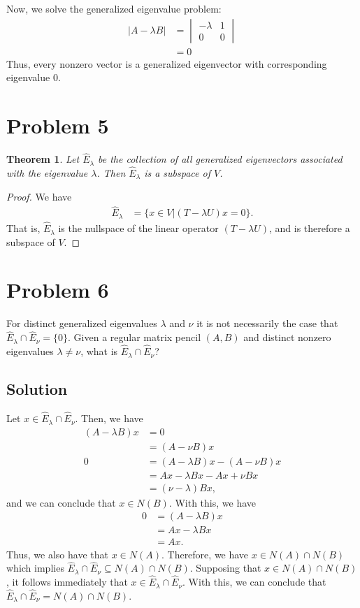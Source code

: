 \documentclass[10pt,a4paper]{article}
\newtheorem{theorem}{Theorem}
\theoremstyle{definition}
\begin{document}
Now, we solve the generalized eigenvalue problem:
\begin{align*}
|A - \lambda B| &= \begin{vmatrix}
- \lambda & 1\\
0 & 0
\end{vmatrix}\\
&= 0
\end{align*}
Thus, every nonzero vector is a generalized eigenvector with corresponding eigenvalue $0$.

\section*{Problem 5}
\begin{theorem}
Let $\hat{E}_\lambda$ be the collection of all generalized eigenvectors associated with the eigenvalue $\lambda$. Then $\hat{E}_\lambda$ is a subspace of $V$.
\end{theorem}

\begin{proof}
We have
\begin{align*}
\hat{E}_\lambda &= \{x \in V | (T - \lambda U)x = 0 \}.
\end{align*}
That is, $\hat{E}_\lambda$ is the nullspace of the linear operator $(T - \lambda U)$, and is therefore a subspace of $V$.
\end{proof}

\section*{Problem 6}
For distinct generalized eigenvalues $\lambda$ and $\nu$ it is not necessarily the case that $\hat{E}_\lambda \cap \hat{E}_\nu = \{0\}$. Given a regular matrix pencil $(A,B)$ and distinct nonzero eigenvalues $\lambda \not = \nu$, what is $\hat{E}_\lambda \cap \hat{E}_\nu$?

\subsection*{Solution}
Let $x \in \hat{E}_\lambda \cap \hat{E}_\nu$. Then, we have
\begin{align*}
(A - \lambda B) x &= 0\\
&= (A - \nu B)x\\
0 &= (A - \lambda B) x - (A - \nu B)x\\
&= Ax - \lambda B x - Ax + \nu B x\\
&= (\nu - \lambda)Bx,
\end{align*}
and we can conclude that $x \in N(B)$. With this, we have
\begin{align*}
0 &= (A - \lambda B)x\\
&= Ax - \lambda Bx\\
&= Ax.
\end{align*}
Thus, we also have that $x \in N(A)$. Therefore, we have $x \in N(A) \cap N(B)$ which implies $\hat{E}_\lambda \cap \hat{E}_\nu \subseteq N(A) \cap N(B)$. Supposing that $x \in N(A) \cap N(B)$, it follows immediately that $x \in \hat{E}_\lambda \cap \hat{E}_\nu$. With this, we can conclude that $\hat{E}_\lambda \cap \hat{E}_\nu = N(A) \cap N(B)$.
\end{document}
